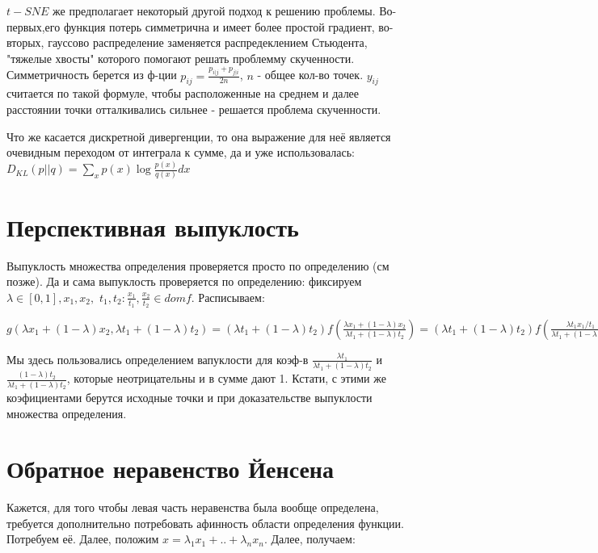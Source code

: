 \documentclass{article}
\begin{document}
$t-SNE$ же предполагает некоторый другой подход к решению проблемы. Во-первых,его функция потерь симметрична и имеет более простой градиент, во-вторых, гауссово распределение заменяется распредеклением Стьюдента, "тяжелые хвосты" которого помогают решать проблемму скученности. Симметричность берется из ф-ции
$\displaystyle p_{ij} = \frac{p_{i |j} + p_{j| i}}{2n}$, $n$ - общее кол-во точек. $y_{ij}$ считается по такой формуле, чтобы расположенные на среднем и далее расстоянии точки отталкивались сильнее - решается проблема скученности. 

Что же касается дискретной дивергенции, то она выражение для неё является очевидным переходом от интеграла к сумме, да и уже использовалась:
$\displaystyle D_{KL}(p||q) = \sum\limits_xp(x)\log\frac{p(x)}{q(x)}dx$
\section{ Перспективная выпуклость} 

Выпуклость множества определения проверяется просто по определению (см позже). Да и сама выпуклость проверяется по определению: фиксируем $\displaystyle \lambda \in [0, 1], x_1, x_2,$ $\displaystyle t_1, t_2: \frac{x_1}{t_1}, \frac{x_2}{t_2} \in dom f$. Расписываем:

$\displaystyle
g(\lambda x_1 + (1 - \lambda)x_2, \lambda t_1 + (1 - \lambda) t_2) = 
(\lambda t_1 + (1 - \lambda) t_2) f(\frac{\lambda x_1 + (1 - \lambda)x_2}{\lambda t_1 + (1 - \lambda) t_2}) =
(\lambda t_1 + (1 - \lambda) t_2) f(
\frac{\lambda t_1 x_1 / t_1}{\lambda t_1 + (1 - \lambda) t_2}
+
\frac{(1 - \lambda) t_2 x_2 / t_2}{\lambda t_1 + (1 - \lambda) t_2}
)
\leq 
\frac{(\lambda t_1 + (1 - \lambda) t_2)}{(\lambda t_1 + (1 - \lambda) t_2)}
(\lambda t_1 f(\frac{x_1}{t_1}) + (1 - \lambda) f(\frac{x_2}{t_2})) = 
\lambda g(x_1, t_1) + (1 - \lambda) g(x_2, t_2)
$

Мы здесь пользовались определением вапуклости для коэф-в $\displaystyle \frac{\lambda t_1}{\lambda t_1 + (1 - \lambda) t_2}$ и
$\displaystyle \frac{(1 - \lambda) t_2}{\lambda t_1 + (1 - \lambda) t_2}$, которые неотрицательны и в сумме дают 1. Кстати, с этими же коэфициентами берутся исходные точки и при доказательстве выпуклости множества определения.

\section{Обратное неравенство Йенсена}  
Кажется, для того чтобы левая часть неравенства была вообще определена, требуется дополнительно потребовать афинность области определения функции. Потребуем её. Далее, положим $x = \lambda_1x_1 + .. + \lambda_nx_n$. Далее, получаем:
\end{document}
